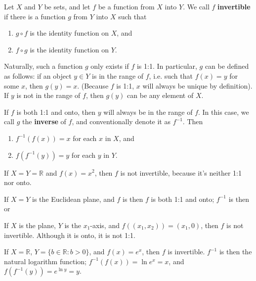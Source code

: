 \documentclass[12pt]{article}
\begin{document}
\begin{defn}
  Let $X$ and $Y$ be sets, and let $f$ be a function from $X$ into $Y$. We call $f$
  \textbf{invertible} if there is a function $g$ from $Y$ into $X$ such that
  \begin{enumerate}
    \item
      $g \circ f$ is the identity function on $X$, and
    \item
      $f \circ g$ is the identity function on $Y$.
  \end{enumerate}

  Naturally, such a function $g$ only exists if $f$ is 1:1. In particular, $g$ can be
  defined as follows: if an object $y \in Y$ is in the range of $f$, i.e. such that
  $f(x) = y$ for some $x$, then $g(y) = x$. (Because $f$ is 1:1, $x$ will always be
  unique by definition). If $y$ is not in the range of $f$, then $g(y)$ can be any
  element of $X$.

  If $f$ is both 1:1 and onto, then $y$ will always be in the range of $f$. In this
  case, we call $g$ the \textbf{inverse} of $f$, and conventionally denote it as
  $f^{-1}$. Then
  \begin{enumerate}
    \item
      $f^{-1}(f(x)) = x$ for each $x$ in $X$, and
    \item
      $f(f^{-1}(y)) = y$ for each $y$ in $Y$.
  \end{enumerate}
\end{defn}

\begin{exm}
  If $X = Y = \mathbb{R}$ and $f(x) = x^2$, then $f$ is not invertible, because it's
  neither 1:1 nor onto.
\end{exm}

\begin{exm}
  If $X = Y$ is the Euclidean plane, and $f$ is 
  then $f$ is both 1:1 and onto; $f^{-1}$ is then  or 
\end{exm}

\begin{exm}
  If $X$ is the plane, $Y$ is the $x_1$-axis, and $f((x_1,x_2)) = (x_1,0)$, then $f$
  is not invertible. Although it is onto, it is not 1:1.
\end{exm}

\begin{exm}
  If $X = \mathbb{R}$, $Y = \{b \in \mathbb{R}: b > 0\}$, and $f(x) = e^x$, then $f$
  is invertible. $f^{-1}$ is then the natural logarithm function; $f^{-1}(f(x)) = \ln
  e^x = x$, and $f(f^{-1}(y)) = e^{\ln y} = y$.
\end{exm}
\end{document}
